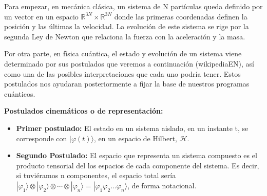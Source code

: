 \vspace{5pt}

Para empezar, en mecánica clásica, un sistema de N partículas queda definido por un vector en un espacio $\mathbb{R}^{3N} \times \mathbb{R}^{3N}$ donde las primeras coordenadas definen la posición y las últimas la velocidad. La evolución de este sistema se rige por la segunda Ley de Newton que relaciona la fuerza con la aceleración y la masa.

\vspace{5pt}

Por otra parte, en física cuántica, el estado y evolución de un sistema viene determinado por sus postulados\cite{B:Nielsen:2002}\cite{Note:Martin} que veremos a continuación (wikipediaEN), así como una de las posibles interpretaciones que cada uno podría tener. Estos postulados nos ayudaran posteriormente a fijar la base de nuestros programas cuánticos.
\vspace{10pt}

\textbf{Postulados cinemáticos o de representación:}
\begin{itemize}
    \item \textbf{Primer postulado:} El estado en un sistema aislado, en un instante t, se corresponde con $| \varphi (t) \rangle$, en un espacio de Hilbert, $\mathscr{H}$.
    
    \item \textbf{Segundo Postulado:} El espacio que representa un sistema compuesto es el producto tensorial del los espacios de cada componente del sistema. Es decir, si tuviéramos n componentes, el espacio total sería $|\varphi_{1}\rangle \otimes |\varphi_{2}\rangle \otimes \dotsi \otimes |\varphi_{n}\rangle = |\varphi_{1}\varphi_{2}\dotso \varphi_{n}\rangle$, de forma notacional.
\end{itemize}

